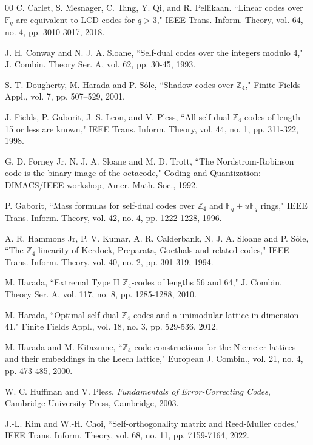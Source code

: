 \documentclass{article}
\theoremstyle{definition}
\theoremstyle{remark}
\begin{document}
\begin{thebibliography}{00}
 C. Carlet, S. Mesnager, C. Tang, Y. Qi, and R. Pellikaan. ``Linear codes over $\mathbb{F}_q$ are equivalent to LCD codes for $q>3$," IEEE Trans. Inform. Theory, vol. 64, no. 4, pp. 3010-3017, 2018.

 J. H. Conway and N. J. A. Sloane, ``Self-dual codes over the integers modulo $4$," J. Combin. Theory Ser. A, vol. 62, pp. 30-45, 1993.

 S. T. Dougherty, M. Harada and P. S\'ole, ``Shadow codes over $\mathbb{Z}_4$," Finite Fields Appl., vol. 7, pp. 507--529, 2001.

 J. Fields, P. Gaborit, J. S. Leon, and V. Pless, ``All self-dual $\mathbb Z_4$ codes of length 15 or less are known," IEEE Trans. Inform. Theory, vol. 44, no. 1, pp. 311-322, 1998.

 G. D. Forney Jr, N. J. A. Sloane and M. D. Trott, ``The Nordstrom-Robinson code is the binary image of the octacode," Coding and Quantization: DIMACS/IEEE workshop, Amer. Math. Soc., 1992.

 P. Gaborit, ``Mass formulas for self-dual codes over $\mathbb Z_4$ and $\mathbb F_q+u\mathbb F_q$ rings," IEEE Trans. Inform. Theory, vol. 42, no. 4, pp. 1222-1228, 1996.

 A. R. Hammons Jr, P. V. Kumar, A. R. Calderbank, N. J. A. Sloane and P. S\'ole, ``The $\mathbb{Z}_4$-linearity of Kerdock, Preparata, Goethals and related codes," IEEE Trans. Inform. Theory, vol. 40, no. 2, pp. 301-319, 1994.

 M. Harada, ``Extremal Type II $\mathbb Z_4$-codes of lengths 56 and 64," J. Combin. Theory Ser. A, vol. 117, no. 8, pp. 1285-1288, 2010.

 M. Harada, ``Optimal self-dual $\mathbb Z_4$-codes and a unimodular lattice in dimension 41," Finite Fields Appl., vol. 18, no. 3, pp. 529-536, 2012.

 M. Harada and M. Kitazume, ``$\mathbb Z_4$-code constructions for the Niemeier lattices and their embeddings in the Leech lattice," European J. Combin., vol. 21, no. 4, pp. 473-485, 2000.

 W. C. Huffman and V. Pless, {\it Fundamentals of Error-Correcting Codes}, Cambridge University Press, Cambridge, 2003.

 J.-L. Kim and W.-H. Choi, ``Self-orthogonality matrix and Reed-Muller codes," IEEE Trans. Inform. Theory, vol. 68, no. 11, pp. 7159-7164, 2022.


\end{thebibliography}
\end{document}
